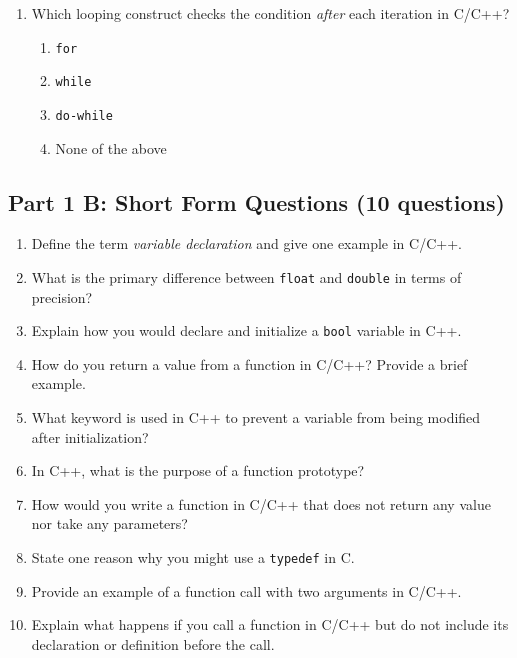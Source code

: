 \documentclass[a4paper,12pt]{article}
\begin{document}
\begin{enumerate}
    \item Which looping construct checks the condition \textit{after} each iteration in C/C++?
    \begin{enumerate}
        \item \texttt{for}
        \item \texttt{while}
        \item \texttt{do-while}
        \item None of the above
    \end{enumerate}
\end{enumerate}

\newpage

\subsection*{Part 1 B: Short Form Questions (10 questions)}
\begin{enumerate}
    \item Define the term \textit{variable declaration} and give one example in C/C++.
    \item What is the primary difference between \texttt{float} and \texttt{double} in terms of precision?
    \item Explain how you would declare and initialize a \texttt{bool} variable in C++.
    \item How do you return a value from a function in C/C++? Provide a brief example.
    \item What keyword is used in C++ to prevent a variable from being modified after initialization?
    \item In C++, what is the purpose of a function prototype?
    \item How would you write a function in C/C++ that does not return any value nor take any parameters?
    \item State one reason why you might use a \texttt{typedef} in C.
    \item Provide an example of a function call with two arguments in C/C++.
    \item Explain what happens if you call a function in C/C++ but do not include its declaration or definition before the call.
\end{enumerate}
\end{document}
